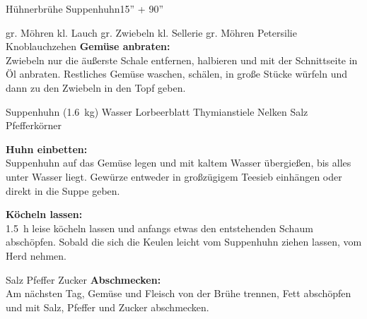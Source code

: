 \begin{MyRecipe}{Hühnerbrühe}{ Suppenhuhn}{15'' + 90''}

\ingredient[\Calc{2}{\x}]{} {gr. Möhren}
\ingredient[\Calc{1}{\x}]{} {kl. Lauch}
\ingredient[\Calc{2}{\x}]{} {gr. Zwiebeln}
\ingredient[\Calc{1}{\x}]{} {kl. Sellerie}
\ingredient[\Calc{3}{\x}]{} {gr. Möhren}
 {Petersilie}
\ingredient[\Calc{2}{\x}]{} {Knoblauchzehen}
\textbf{Gemüse anbraten:}\\
Zwiebeln nur die äußerste Schale entfernen, halbieren und mit der Schnittseite in Öl anbraten. Restliches Gemüse waschen, schälen, in große Stücke würfeln und dann zu den Zwiebeln in den Topf geben.

\ingredient[\Calc{1}{\x}]{} {Suppenhuhn (\SI{1,6}{\kilogram})}
 {Wasser}
\ingredient[\Calc{2}{\x}]{} {Lorbeerblatt}
\ingredient[\Calc{4}{\x}]{} {Thymianstiele}
\ingredient[\Calc{2}{\x}]{} {Nelken}
 {Salz}
 {Pfefferkörner}

\textbf{Huhn einbetten:}\\
Suppenhuhn auf das Gemüse legen und mit kaltem Wasser übergießen, bis alles unter Wasser liegt. Gewürze entweder in großzügigem Teesieb einhängen oder direkt in die Suppe geben.

\textbf{Köcheln lassen:}\\
\SI{1,5}{\hour} leise köcheln lassen und anfangs etwas den entstehenden Schaum abschöpfen. Sobald die sich die Keulen leicht vom Suppenhuhn ziehen lassen, vom Herd nehmen.\par

\ingredient[]{} {Salz}
\ingredient[]{} {Pfeffer}
\ingredient[]{} {Zucker}
\textbf{Abschmecken:}\\
Am nächsten Tag, Gemüse und Fleisch von der Brühe trennen, Fett abschöpfen und mit Salz, Pfeffer und Zucker abschmecken.









\end{MyRecipe}
